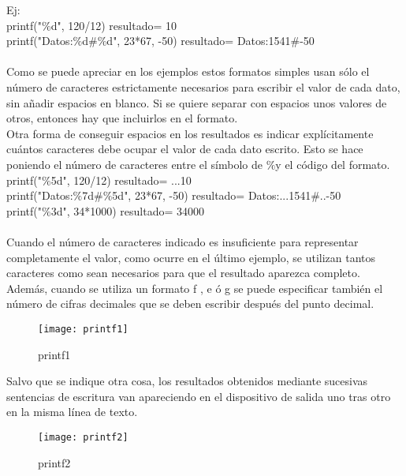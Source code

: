 \documentclass[11pt,a4paper]{article}
\begin{document}
	Ej:\\
	printf("$\%$d", 120/12) resultado=    10\\
	printf("Datos:$\%$d$\#$$\%$d", 23*67, -50) resultado=    Datos:1541$\#$-50\\
	\\
	Como se puede apreciar en los ejemplos estos formatos simples usan sólo el número de caracteres estrictamente necesarios para escribir el valor de cada dato, sin añadir espacios en blanco. Si se quiere separar con espacios unos valores de otros, entonces hay que incluirlos en el formato. \\
	Otra forma de conseguir espacios en los resultados es indicar explícitamente 
	cuántos caracteres debe ocupar el valor de cada dato escrito. Esto se hace 
	poniendo el número de caracteres entre el símbolo de $\% $y el código del formato.\\
	 	printf("$\%$5d", 120/12) resultado=  ...10\\
	 	printf("Datos:$\%$7d$\#$$\%$5d", 23*67, -50) resultado=    Datos:...1541$\#$..-50\\
	 	printf("$\%$3d", 34*1000) resultado= 34000\\
	 	\\
	 	Cuando el número de caracteres indicado es insuficiente para representar completamente el valor, como ocurre en el último ejemplo, se utilizan tantos caracteres como sean necesarios para que el resultado aparezca completo.\\
	 	Además, cuando se utiliza un formato f , e ó g se puede especificar también el 
	 	número de cifras decimales que se deben escribir después del punto decimal.
	 		\begin{figure}[htb]
	 		\centering
	 		\texttt{[image: printf1]}
	 		\caption{printf1}
	 		\label{fig:printf1}
	 	\end{figure} 
	 	Salvo que se indique otra cosa, los resultados obtenidos mediante sucesivas sentencias de escritura van apareciendo en el dispositivo de salida uno tras otro en la misma línea de texto.
	 	\begin{figure}[htb]
	 		\centering
	 		\texttt{[image: printf2]}
	 		\caption{printf2}
	 		\label{fig:printf2}
	 	\end{figure} 
\end{document}
